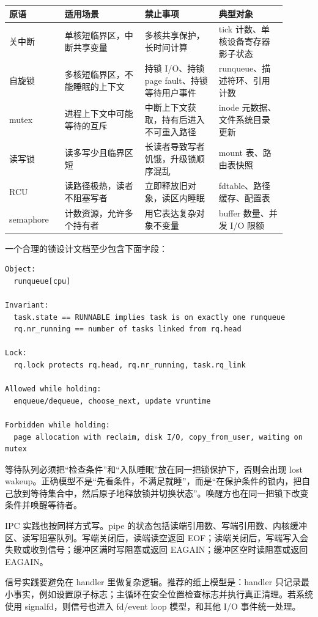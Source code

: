 \begin{longtable}{p{0.18\linewidth}p{0.26\linewidth}p{0.24\linewidth}p{0.22\linewidth}}
\toprule
原语 & 适用场景 & 禁止事项 & 典型对象 \\
\midrule
关中断 & 单核短临界区，中断共享变量 & 多核共享保护，长时间计算 & tick 计数、单核设备寄存器影子状态 \\
自旋锁 & 多核短临界区，不能睡眠的上下文 & 持锁 I/O、持锁 page fault、持锁等待用户事件 & runqueue、描述符环、引用计数 \\
mutex & 进程上下文中可能等待的互斥 & 中断上下文获取，持有后进入不可重入路径 & inode 元数据、文件系统目录更新 \\
读写锁 & 读多写少且临界区短 & 长读者导致写者饥饿，升级锁顺序混乱 & mount 表、路由表快照 \\
RCU & 读路径极热，读者不阻塞写者 & 立即释放旧对象，读区内睡眠 & fdtable、路径缓存、配置表 \\
semaphore & 计数资源，允许多个持有者 & 用它表达复杂对象不变量 & buffer 数量、并发 I/O 限额 \\
\bottomrule
\end{longtable}

一个合理的锁设计文档至少包含下面字段：

\begin{lstlisting}
Object:
  runqueue[cpu]

Invariant:
  task.state == RUNNABLE implies task is on exactly one runqueue
  rq.nr_running == number of tasks linked from rq.head

Lock:
  rq.lock protects rq.head, rq.nr_running, task.rq_link

Allowed while holding:
  enqueue/dequeue, choose_next, update vruntime

Forbidden while holding:
  page allocation with reclaim, disk I/O, copy_from_user, waiting on mutex
\end{lstlisting}

等待队列必须把“检查条件”和“入队睡眠”放在同一把锁保护下，否则会出现 lost wakeup。正确模型不是“先看条件，不满足就睡”，而是“在保护条件的锁内，把自己放到等待集合中，然后原子地释放锁并切换状态”。唤醒方也在同一把锁下改变条件并唤醒等待者。

IPC 实践也按同样方式写。pipe 的状态包括读端引用数、写端引用数、内核缓冲区、读写阻塞队列。写端关闭后，读端读空返回 EOF；读端关闭后，写端写入会失败或收到信号；缓冲区满时写阻塞或返回 EAGAIN；缓冲区空时读阻塞或返回 EAGAIN。

信号实践要避免在 handler 里做复杂逻辑。推荐的纸上模型是：handler 只记录最小事实，例如设置原子标志；主循环在安全位置检查标志并执行真正清理。若系统使用 signalfd，则信号也进入 fd/event loop 模型，和其他 I/O 事件统一处理。

